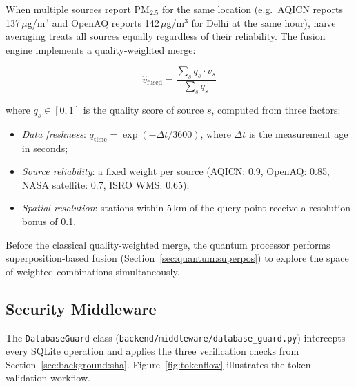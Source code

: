 \documentclass[12pt,a4paper]{article}
\begin{document}
When multiple sources report $\text{PM}_{2.5}$ for the same location (e.g.\
AQICN reports 137\,$\mu$g/m$^3$ and OpenAQ reports 142\,$\mu$g/m$^3$ for
Delhi at the same hour), na\"ive averaging treats all sources equally regardless
of their reliability. The fusion engine implements a quality-weighted merge:

\begin{equation}
\hat{v}_{\text{fused}} = \frac{\sum_s q_s \cdot v_s}{\sum_s q_s}
\label{eq:qualityfusion}
\end{equation}

\noindent where $q_s \in [0,1]$ is the quality score of source $s$, computed
from three factors:
\begin{itemize}[leftmargin=*]
\item \emph{Data freshness}: $q_{\text{time}} = \exp(-\Delta t / 3600)$, where
      $\Delta t$ is the measurement age in seconds;
\item \emph{Source reliability}: a fixed weight per source
      (AQICN: 0.9, OpenAQ: 0.85, NASA satellite: 0.7, ISRO WMS: 0.65);
\item \emph{Spatial resolution}: stations within 5\,km of the query point
      receive a resolution bonus of 0.1.
\end{itemize}

Before the classical quality-weighted merge, the quantum processor performs
superposition-based fusion (Section~\ref{sec:quantum:superpos}) to explore
the space of weighted combinations simultaneously.

\subsection{Security Middleware}
\label{sec:impl:security}

The \texttt{DatabaseGuard} class (\texttt{backend/middleware/database\_guard.py})
intercepts every SQLite operation and applies the three verification checks
from Section~\ref{sec:background:sha}. Figure~\ref{fig:tokenflow} illustrates
the token validation workflow.
\end{document}
